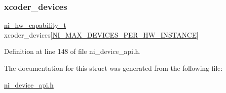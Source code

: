 \mbox{\label{struct__ni__device__capability_a819804d2d3d3fb563024e306bbeedce6}} 
\subsubsection{\texorpdfstring{xcoder\_devices}{xcoder\_devices}}
{\footnotesize\ttfamily \mbox{\hyperlink{ni__device__api_8h_aa613b88d7181b67f6fabca9f0a1ea37c}{ni\+\_\+hw\+\_\+capability\+\_\+t}} xcoder\+\_\+devices\mbox{[}\mbox{\hyperlink{ni__device__api_8h_a71825b287385d9e2120ae13083aad09d}{N\+I\+\_\+\+M\+A\+X\+\_\+\+D\+E\+V\+I\+C\+E\+S\+\_\+\+P\+E\+R\+\_\+\+H\+W\+\_\+\+I\+N\+S\+T\+A\+N\+CE}}\mbox{]}}



Definition at line 148 of file ni\+\_\+device\+\_\+api.\+h.



The documentation for this struct was generated from the following file\+:\begin{DoxyCompactItemize}
\item 
\mbox{\hyperlink{ni__device__api_8h}{ni\+\_\+device\+\_\+api.\+h}}\end{DoxyCompactItemize}
